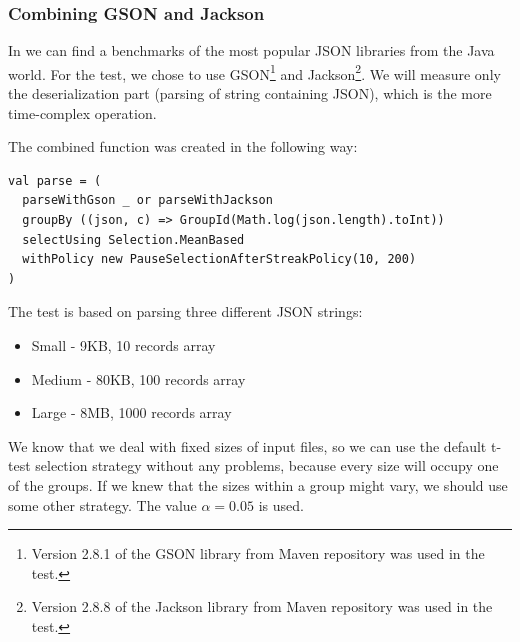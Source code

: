 \subsubsection{Combining GSON and Jackson}

In \cite{dreyfuss_ultimate_2015} we can find a benchmarks of the most popular JSON libraries from the Java world. For the test, we chose to use GSON\footnote{Version 2.8.1 of the GSON library from Maven repository was used in the test.} and Jackson\footnote{Version 2.8.8 of the Jackson library from Maven repository was used in the test.}. We will measure only the deserialization part (parsing of string containing JSON), which is the more time-complex operation. 

The combined function was created in the following way:
\lstset{style=Scala}
\begin{lstlisting}
val parse = (
  parseWithGson _ or parseWithJackson
  groupBy ((json, c) => GroupId(Math.log(json.length).toInt))
  selectUsing Selection.MeanBased
  withPolicy new PauseSelectionAfterStreakPolicy(10, 200)
)
\end{lstlisting}

The test is based on parsing three different JSON strings:

\begin{itemize}
	\item Small - 9KB, 10 records array
	\item Medium - 80KB, 100 records array
	\item Large - 8MB, 1000 records array
\end{itemize}

We know that we deal with fixed sizes of input files, so we can use the default t-test selection strategy without any problems, because every size will occupy one of the groups. If we knew that the sizes within a group might vary, we should use some other strategy. The value $\alpha = 0.05$ is used.

